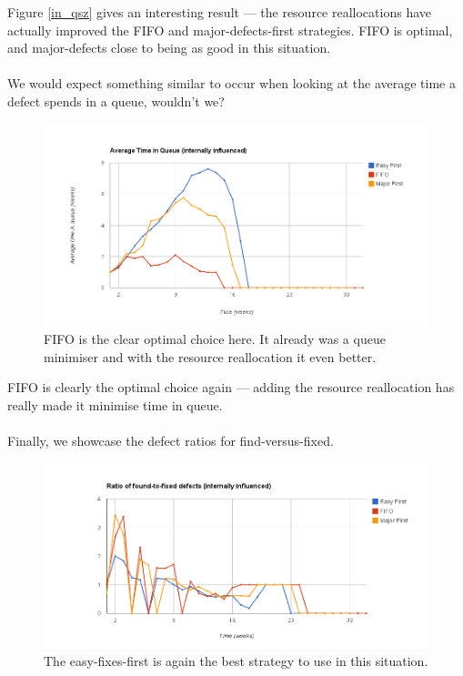 Figure \ref{in_qsz} gives an interesting result --- the resource reallocations have actually
improved the FIFO and major-defects-first strategies.
FIFO is optimal, and major-defects close to being as good in this situation.\\
\\
We would expect something similar to occur when looking at the average time a defect spends in a
queue, wouldn't we?

\pagebreak

\begin{figure}[ht!]
	\centering
	\includegraphics[scale=0.45]{graphs/avgQueueTime_in.png}
	\caption{FIFO is the clear optimal choice here. It already was a queue minimiser and with the
resource reallocation it even better.} 
	\label{in_avgqtime}
\end{figure}

FIFO is clearly the optimal choice again --- adding the resource reallocation has really made it
minimise time in queue.\\
\\
Finally, we showcase the defect ratios for find-versus-fixed.

\pagebreak

\begin{figure}[ht!]
	\centering
	\includegraphics[scale=0.45]{graphs/RatioFF_in.png}
	\caption{The easy-fixes-first is again the best strategy to use in this situation.}
	\label{in_ratioff}
\end{figure}

